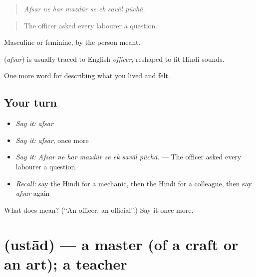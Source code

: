 \begin{quote}
       
\end{quote}

\begin{quote}
\emph{Afsar ne har mazdūr se ek savāl pūchā.}
\end{quote}

\begin{quote}
The officer asked every labourer a question.
\end{quote}

Masculine or feminine, by the person meant.

\begin{cousinweb}
\textbf{} (\emph{afsar}) is usually traced to English \emph{officer}, reshaped to fit Hindi sounds.
\end{cousinweb}

\begin{grammarlens}[title={What you've built}]
One more word for describing what you lived and felt.
\end{grammarlens}

\subsection*{Your turn}
\begin{itemize}
\raggedright
  \item \emph{Say it:} \emph{afsar}
  \item \emph{Say it:} \emph{afsar}, once more
  \item \emph{Say it:} \emph{Afsar ne har mazdūr se ek savāl pūchā.} — The officer asked every labourer a question.
  \item \emph{Recall:} say the Hindi for a mechanic, then the Hindi for a colleague, then say \emph{afsar} again
\end{itemize}

\begin{tcolorbox}[breakable,colback=teal!4,colframe=teal!35!black,title={Before you move on}]
What does  mean? (\textquotedblleft{}An officer; an official\textquotedblright{}.) Say it once more.
\end{tcolorbox}
\section[\texorpdfstring{\hi{उस्ताद} (ustād)}{उस्ताद (ustād)}]{ (ustād) — a master (of a craft or an art); a teacher}

